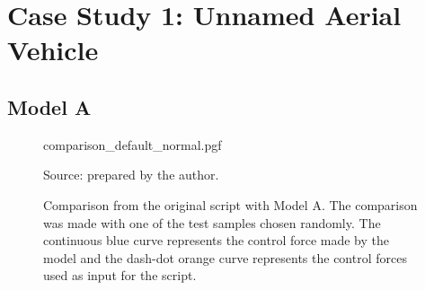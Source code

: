 \section{Case Study 1: Unnamed Aerial Vehicle}

\subsection{Model A}

\begin{figure}[!htb]
    \centering
    \caption[Comparison from the original script with Model A]{Comparison from the original script with Model A. The comparison was made with one of the test samples chosen randomly. The continuous blue curve represents the control force made by the model and the dash-dot orange curve represents the control forces used as input for the script.}
    {comparison_default_normal.pgf}

    {\footnotesize Source: prepared by the author.}
    \label{fig:model_a_comparison}
\end{figure}